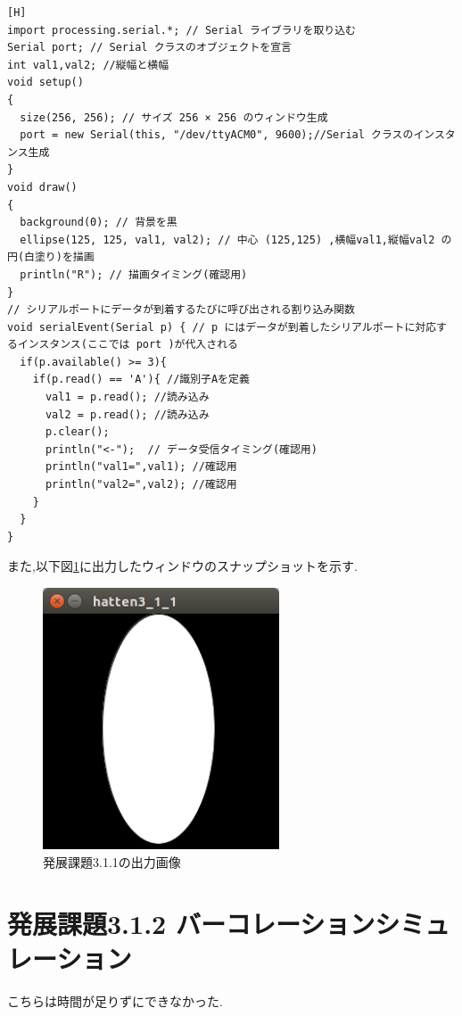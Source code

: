 \documentclass{jarticle}
\begin{document}
\begin{lstlisting}[caption = 発展課題3.1.1(Processing),label=code:hatten3-1-1-p][H]
import processing.serial.*; // Serial ライブラリを取り込む
Serial port; // Serial クラスのオブジェクトを宣言
int val1,val2; //縦幅と横幅
void setup()
{
  size(256, 256); // サイズ 256 × 256 のウィンドウ生成
  port = new Serial(this, "/dev/ttyACM0", 9600);//Serial クラスのインスタンス生成
}
void draw()
{
  background(0); // 背景を黒
  ellipse(125, 125, val1, val2); // 中心 (125,125) ,横幅val1,縦幅val2 の円(白塗り)を描画
  println("R"); // 描画タイミング(確認用)
}
// シリアルポートにデータが到着するたびに呼び出される割り込み関数
void serialEvent(Serial p) { // p にはデータが到着したシリアルポートに対応するインスタンス(ここでは port )が代入される
  if(p.available() >= 3){
    if(p.read() == 'A'){ //識別子Aを定義
      val1 = p.read(); //読み込み
      val2 = p.read(); //読み込み
      p.clear();
      println("<-");  // データ受信タイミング(確認用)
      println("val1=",val1); //確認用
      println("val2=",val2); //確認用
    }
  }
}

\end{lstlisting}


また,以下図\ref{fig:hatten3-1-1}に出力したウィンドウのスナップショットを示す.

\begin{figure}[H]
\begin{center}
\includegraphics[width=7.0cm]{images/hatten3-1-1.png}
\caption{発展課題3.1.1の出力画像}
\label{fig:hatten3-1-1}
\end{center}
\end{figure}


\section{発展課題3.1.2 バーコレーションシミュレーション}
こちらは時間が足りずにできなかった.
\end{document}
